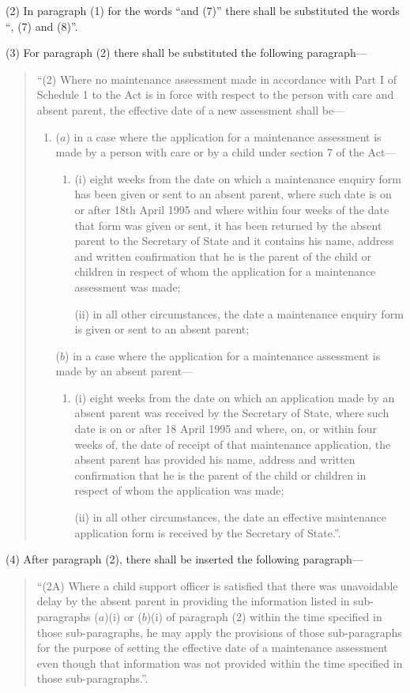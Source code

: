 \documentclass[a4paper]{article}
\begin{document}
(2) In paragraph (1) for the words “and (7)” there shall be substituted the words “, (7) and (8)”.

(3) For paragraph (2) there shall be substituted the following paragraph—
\begin{quotation}
“(2) Where no maintenance assessment made in accordance with Part I of Schedule 1 to the Act is in force with respect to the person with care and absent parent, the effective date of a new assessment shall be—
\begin{enumerate}\item[]
($a$) in a case where the application for a maintenance assessment is made by a person with care or by a child under section 7 of the Act—
\begin{enumerate}\item[]
(i) eight weeks from the date on which a maintenance enquiry form has been given or sent to an absent parent, where such date is on or after 18th April 1995 and where within four weeks of the date that form was given or sent, it has been returned by the absent parent to the Secretary of State and it contains his name, address and written confirmation that he is the parent of the child or children in respect of whom the application for a maintenance assessment was made;

(ii) in all other circumstances, the date a maintenance enquiry form is given or sent to an absent parent;
\end{enumerate}

($b$) in a case where the application for a maintenance assessment is made by an absent parent—
\begin{enumerate}\item[]
(i) eight weeks from the date on which an application made by an absent parent was received by the Secretary of State, where such date is on or after 18 April 1995 and where, on, or within four weeks of, the date of receipt of that maintenance application, the absent parent has provided his name, address and written confirmation that he is the parent of the child or children in respect of whom the application was made;

(ii) in all other circumstances, the date an effective maintenance application form is received by the Secretary of State.”.
\end{enumerate}
\end{enumerate}
\end{quotation}

(4) After paragraph (2), there shall be inserted the following paragraph—
\begin{quotation}
“(2A) Where a child support officer is satisfied that there was unavoidable delay by the absent parent in providing the information listed in sub-paragraphs ($a$)(i) or ($b$)(i) of paragraph (2) within the time specified in those sub-paragraphs, he may apply the provisions of those sub-paragraphs for the purpose of setting the effective date of a maintenance assessment even though that information was not provided within the time specified in those sub-paragraphs.”.
\end{quotation}
\end{document}
